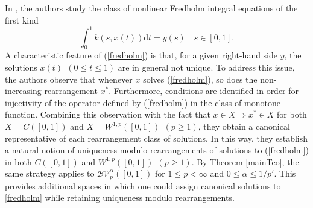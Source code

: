\documentclass{amsart}
\numberwithin{equation}{section}
\begin{document}
In \cite{EnHoZe93}, the authors study the class of nonlinear Fredholm integral equations of the first kind
\begin{equation}
    \label{fredholm}
    \int_0^1k(s,x(t))\mathrm{d}t=y(s)\quad s\in[0,1].
\end{equation}
A characteristic feature of (\ref{fredholm}) is that, for a given right-hand side $y$, the solutions $x(t)~~(0\le t\le1)$ are in general not unique. To address this issue, the authors observe that whenever $x$ solves (\ref{fredholm}), so does the non-increasing rearrangement $x^*$. Furthermore, conditions are identified in order for injectivity of the operator defined by (\ref{fredholm}) in the class of monotone function. Combining this observation with the fact that $x\in X\Rightarrow x^*\in X$  for both $X=C([0,1])$ and $X=W^{1,p}([0,1])~~(p\ge1)$,
they obtain a canonical representative of each rearrangement class of solutions. In this way, they establish a natural notion of uniqueness modulo rearrangements of solutions to (\ref{fredholm}) in both $C([0,1])$ and $W^{1,p}([0,1])~~(p\ge1)$. By Theorem \ref{mainTeo}, the same strategy applies to $\mathcal{BV}_p^\alpha([0,1])$ for $1\le p<\infty$ and $0\le\alpha\le 1/p'$.  This provides additional spaces in which one could assign canonical solutions to \eqref{fredholm} while retaining uniqueness modulo rearrangements. 



\end{document}

